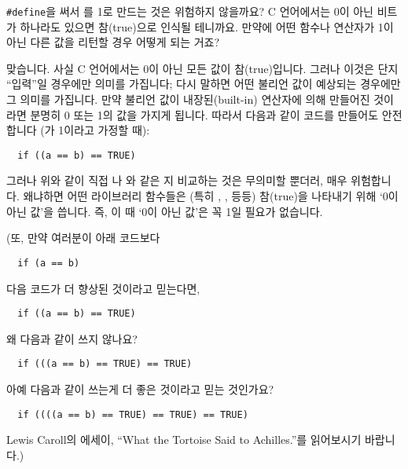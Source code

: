\begin{faq}
	\verb+#define+을 써서 를 1로 만드는 것은 위험하지 않을까요?
	C 언어에서는 0이 아닌 비트가 하나라도 있으면 참(true)으로 인식될
	테니까요.  만약에 어떤 함수나 연산자가 1이 아닌 다른 값을 리턴할 경우
	어떻게 되는 거죠?

\A
	맞습니다.  사실 C 언어에서는 0이 아닌 모든 값이 참(true)입니다.
	그러나 이것은 단지 ``입력''일 경우에만 의미를
	가집니다; 다시 말하면 어떤 불리언 값이 예상되는 경우에만 그 의미를
	가집니다.  만약 불리언 값이 내장된(built-in) 연산자에 의해 만들어진
	것이라면 분명히 0 또는 1의 값을 가지게 됩니다.  따라서 다음과 같이
	코드를 만들어도 안전합니다 (가 1이라고 가정할 때):
\begin{verbatim}
  if ((a == b) == TRUE)
\end{verbatim}
	그러나 위와 같이 직접 나 와 같은 지 비교하는 것은
        무의미할 뿐더러, 매우 위험합니다.
	왜냐하면 어떤 라이브러리 함수들은 (특히 ,
	, 등등) 참(true)을 나타내기 위해 `0이 아닌 값'을 씁니다.
        즉, 이 때 `0이 아닌 값'은 꼭 1일 필요가 없습니다.
        
	(또, 만약 여러분이 아래 코드보다
\begin{verbatim}
  if (a == b)
\end{verbatim}
	\noindent 다음 코드가 더 향상된 것이라고 믿는다면,
\begin{verbatim}
  if ((a == b) == TRUE)
\end{verbatim}
        \noindent 왜 다음과 같이 쓰지 않나요?
\begin{verbatim}
  if (((a == b) == TRUE) == TRUE)
\end{verbatim}
	\noindent 아예 다음과 같이 쓰는게 더 좋은 것이라고 믿는 것인가요?
\begin{verbatim}
  if ((((a == b) == TRUE) == TRUE) == TRUE)
\end{verbatim}
	\noindent Lewis Caroll의 에세이,
        ``What the Tortoise Said to Achilles.''를 읽어보시기 바랍니다.)


\end{faq}
